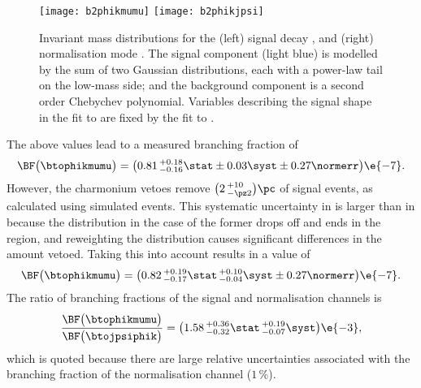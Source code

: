 \begin{figure}
  \begin{center}
    \texttt{[image: b2phikmumu]}
    \texttt{[image: b2phikjpsi]}
    \caption[Fits to \btokphimumu and \btojpsiphik candidates]
    {
      Invariant mass distributions for the
      (left) signal decay \btophikmumu, and
      (right) normalisation mode \btojpsiphik.
      The signal component (light blue) is modelled by the sum of two Gaussian distributions, each
      with a power-law tail on the low-mass side; and the background component is a second order
      Chebychev polynomial.
      Variables describing the signal shape in the fit to \btophikmumu are fixed by the fit to
      \btojpsiphik.
    }
    \label{fig:phik:fit}
  \end{center}
\end{figure}

The above values lead to a measured branching fraction of
\begin{equation}
  \BF\big(\btophikmumu\big)=
  \big(0.81\,^{+0.18}_{-0.16}\stat\pm0.03\syst\pm0.27\normerr\big)\e{-7}.
\end{equation}
However, the charmonium vetoes remove $\big(2\,^{+10}_{-\pz2}\big)\pc$ of signal events, as
calculated using simulated events.
This systematic uncertainty in \btophikmumu is larger than in \btokpipimumu because the \qsq
distribution in the case of the former drops off and ends in the \jpsi region, and reweighting the
\qsq distribution causes significant differences in the amount vetoed.
Taking this into account results in a value of
\begin{equation}
  \BF\big(\btophikmumu\big)=
  \big(0.82\,^{+0.19}_{-0.17}\stat\,^{+0.10}_{-0.04}\syst\pm0.27\normerr\big)\e{-7}.
\end{equation}
The ratio of branching fractions of the signal and normalisation channels is
\begin{equation}
  \frac{ \BF\big(\btophikmumu\big) }{ \BF\big(\btojpsiphik\big) }
  =\big(1.58\,^{+0.36}_{-0.32}\stat\,^{+0.19}_{-0.07}\syst\big)\e{-3},
\end{equation}
which is quoted because there are large relative uncertainties associated with the branching
fraction of the normalisation channel (\approx$1\,\%$).



